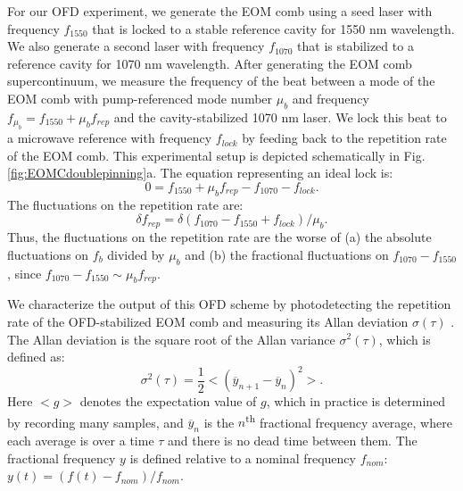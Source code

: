 For our OFD experiment, we generate the EOM comb using a seed laser with frequency $f_{1550}$ that is locked to a stable reference cavity for 1550 nm wavelength. We also generate a second laser with frequency $f_{1070}$ that is stabilized to a reference cavity for 1070 nm wavelength. After generating the EOM comb supercontinuum, we measure the frequency of the beat between a mode of the EOM comb with pump-referenced mode number $\mu_b$ and frequency $f_{\mu_b}=f_{1550}+\mu_b f_{rep}$ and the cavity-stabilized 1070 nm laser. We lock this beat to a microwave reference with frequency $f_{lock}$ by feeding back to the repetition rate of the EOM comb. This experimental setup is depicted schematically in Fig. \ref{fig:EOMCdoublepinning}a. The equation representing an ideal lock is:
\begin{equation}
0=f_{1550}+\mu_b f_{rep}-f_{1070}-f_{lock}.
\end{equation}
The fluctuations on the repetition rate are:
\begin{equation}
\delta f_{rep}=\delta(f_{1070}-f_{1550}+f_{lock})/\mu_b.
\end{equation}
Thus, the fluctuations on the repetition rate are the worse of (a) the absolute fluctuations on $f_b$ divided by $\mu_b$ and (b) the fractional fluctuations on $f_{1070}-f_{1550}$, since $f_{1070}-f_{1550}\sim\mu_b f_{rep}$.

We characterize the output of this OFD scheme by photodetecting the repetition rate of the OFD-stabilized EOM comb and measuring its Allan deviation $\sigma(\tau)$ \cite{Levine1999}. The Allan deviation is the square root of the Allan variance $\sigma^2(\tau)$, which is defined as:
\begin{equation}
\sigma^2(\tau)=\frac{1}{2}<(\overline{y}_{n+1}-\overline{y}_n)^2>.
\end{equation}
Here $<g>$ denotes the expectation value of $g$, which in practice is determined by recording many samples, and $\overline{y}_n$ is the $n$\textsuperscript{th} fractional frequency average, where each average is over a time $\tau$ and there is no dead time between them. The fractional frequency $y$ is defined relative to a nominal frequency $f_{nom}$: $y(t)=(f(t)-f_{nom})/f_{nom}$.

